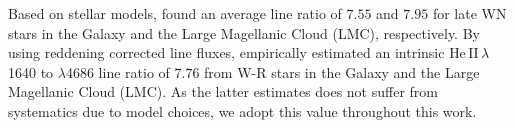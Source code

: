 \documentclass[linenumbers]{aastex63}
\begin{document}
Based on stellar models, \citet{schaerer_new_1998} found an average line ratio of $7.55$ and $7.95$ for late WN stars in the Galaxy and the Large Magellanic Cloud (LMC), respectively.
By using reddening corrected line fluxes, \citet{leitherer_he_2019} empirically estimated an intrinsic He\,II\,$\lambda$1640 to $\lambda$4686 line ratio of $7.76$ from W-R stars in the Galaxy and the Large Magellanic Cloud (LMC). As the latter estimates does not suffer from systematics due to model choices, we adopt this value throughout this work.

\end{document}
